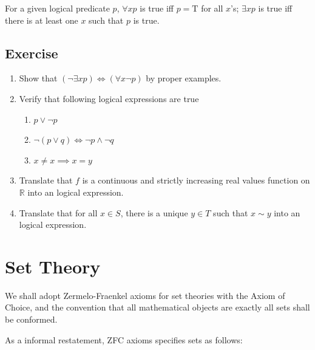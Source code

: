 \documentclass{book}
\theoremstyle{definition}\newtheorem{mechanism}{Mechanism}
\theoremstyle{remark}\newtheorem*{remark}{Remark}
\newcommand{\true}{\mathrm{T}}
\begin{document}
For a given logical predicate $p$, $\forall xp$ is true iff $p = \true$ for all $x$'s; $\exists xp$ is true iff there is at least one $x$ such that $p$ is true.

\subsection*{Exercise}

\begin{enumerate}
	\item Show that $(\neg\exists xp)\iff (\forall x\neg p)$ by proper examples.
	\item Verify that following logical expressions are true
	\begin{enumerate}
		\item $p \lor \neg p$
		\item $\neg(p \lor q) \iff \neg p \land \neg q$
		\item $x\ne x \implies x = y$
	\end{enumerate}
	\item Translate that $f$ is a continuous and strictly increasing real values function on $\mathbb R$ into an logical expression.
	\item Translate that for all $x\in S$, there is a unique $y\in T$ such that $x\sim y$ into an logical expression.
\end{enumerate}

\section{Set Theory}

We shall adopt Zermelo-Fraenkel axioms for set theories with the Axiom of Choice, and the convention that all mathematical objects are exactly all sets shall be conformed.

As a informal restatement, ZFC axioms specifies sets as follows:
\end{document}
